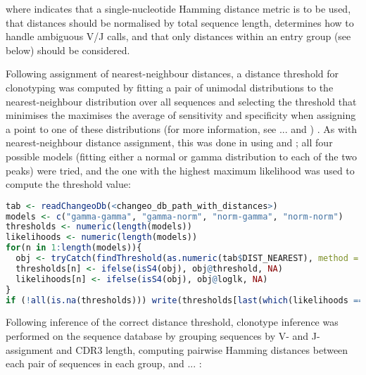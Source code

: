 {where  indicates that a single-nucleotide Hamming distance metric is to be used,  that distances should be normalised by total sequence length,  determines how to handle ambiguous V/J calls, and  that only distances within an entry group (see below) should be considered.

Following assignment of nearest-neighbour distances, a distance threshold for clonotyping was computed by fitting a pair of unimodal distributions to the nearest-neighbour distribution over all sequences and selecting the threshold that minimises the maximises the average of sensitivity and specificity when assigning a point to one of these distributions (for more information, see ... and \parencite{nouri2018threshold}) .%
As with nearest-neighbour distance assignment, this was done in  using  and ; all four possible models (fitting either a normal or gamma distribution to each of the two peaks) were tried, and the one with the highest maximum likelihood was used to compute the threshold value:

\begin{lstlisting}[language=R]
tab <- readChangeoDb(<changeo_db_path_with_distances>)
models <- c("gamma-gamma", "gamma-norm", "norm-gamma", "norm-norm")
thresholds <- numeric(length(models))
likelihoods <- numeric(length(models))
for(n in 1:length(models)){
  obj <- tryCatch(findThreshold(as.numeric(tab$DIST_NEAREST), method = "gmm", model = "hmm", cutoff = "opt"), error = function(e) return(e$message), warning = function(w) return(w$message))
  thresholds[n] <- ifelse(isS4(obj), obj@threshold, NA)
  likelihoods[n] <- ifelse(isS4(obj), obj@loglk, NA)
}
if (!all(is.na(thresholds))) write(thresholds[last(which(likelihoods == max(likelihoods, na.rm = TRUE))], <threshold_output_path>)
\end{lstlisting} 

Following inference of the correct distance threshold, clonotype inference was performed on the sequence database by grouping sequences by V- and J-assignment and CDR3 length, computing pairwise Hamming distances between each pair of sequences in each group, and ... : %


}
